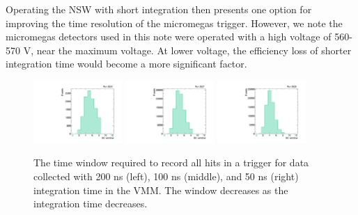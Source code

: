 Operating the NSW with short integration then presents one option for improving the time resolution of the micromegas trigger. However, we note the micromegas detectors used in this note were operated with a high voltage of 560-570 V, near the maximum voltage. At lower voltage, the efficiency loss of shorter integration time would become a more significant factor.

\begin{figure}[!htpb]
  \begin{center}
    \includegraphics[width=0.3\textwidth]{figures/gbtanalysis3530/artwin_lin.pdf}
    \includegraphics[width=0.3\textwidth]{figures/gbtanalysis3527/artwin_lin.pdf}
    \includegraphics[width=0.3\textwidth]{figures/gbtanalysis3528/artwin_lin.pdf}
  \end{center}
  \vspace{-10pt}
  \caption{The time window required to record all hits in a trigger for data collected with 200 ns (left), 100 ns (middle), and 50 ns (right) integration time in the VMM. The window decreases as the integration time decreases.}
  \label{fig:integ_window}
\end{figure}

